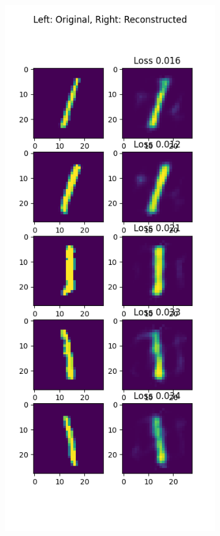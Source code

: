 \begin{solve}
\begin{figure}[H]
\begin{subfigure}{.5\textwidth}
\end{subfigure}%
\begin{subfigure}{.5\textwidth}
  \centering
  \includegraphics[width=.9\linewidth]{plots/output_1.png}

\end{subfigure}
\end{figure}
\end{solve}
